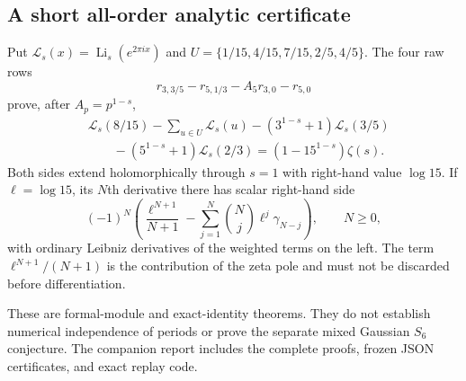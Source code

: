\subsection{A short all-order analytic certificate}
Put $\mathcal L_s(x)=\operatorname{Li}_s(e^{2\pi i x})$ and
$U=\{1/15,4/15,7/15,2/5,4/5\}$. The four raw rows
\[
 r_{3,3/5}-r_{5,1/3}-A_5r_{3,0}-r_{5,0}
\]
prove, after $A_p=p^{1-s}$,
\begin{align*}
 &\mathcal L_s(8/15)-\sum_{u\in U}\mathcal L_s(u)
 -(3^{1-s}+1)\mathcal L_s(3/5)\\
 &\qquad -(5^{1-s}+1)\mathcal L_s(2/3)
 =(1-15^{1-s})\zeta(s).
\end{align*}
Both sides extend holomorphically through $s=1$ with right-hand value
$\log15$. If $\ell=\log15$, its $N$th derivative there has scalar
right-hand side
\[
 (-1)^N\left(\frac{\ell^{N+1}}{N+1}
 -\sum_{j=1}^N\binom Nj\ell^j\gamma_{N-j}\right),\qquad N\ge0,
\]
with ordinary Leibniz derivatives of the weighted terms on the left.
The term $\ell^{N+1}/(N+1)$ is the contribution of the zeta pole and
must not be discarded before differentiation.

These are formal-module and exact-identity theorems. They do not
establish numerical independence of periods or prove the separate
mixed Gaussian $S_6$ conjecture. The companion report includes the
complete proofs, frozen JSON certificates, and exact replay code.
